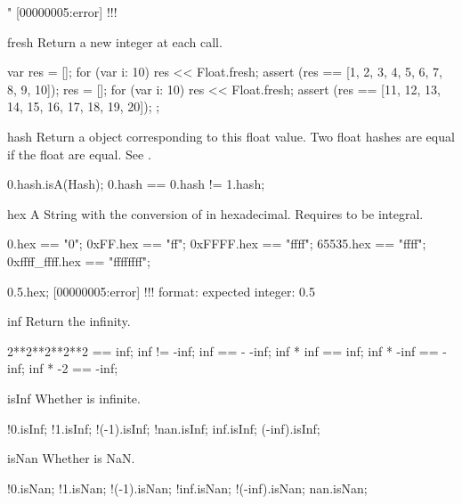 \begin{urbiscriptapi}
\begin{urbiassert}
"%
[00000005:error] !!! %
\end{urbiassert}

\item[fresh]%
  Return a new integer at each call.
\begin{urbiscript}
{
  var res = [];
  for (var i: 10)
    res << Float.fresh;
  assert (res == [1, 2, 3, 4, 5, 6, 7, 8, 9, 10]);
  res = [];
  for (var i: 10)
    res << Float.fresh;
  assert (res == [11, 12, 13, 14, 15, 16, 17, 18, 19, 20]);
};
\end{urbiscript}

\item[hash] Return a  object corresponding to this float
  value. Two float hashes are equal if the float are equal. See
  .

\begin{urbiassert}
0.hash.isA(Hash);
0.hash == 0.hash != 1.hash;
\end{urbiassert}

\item[hex]
  A String with the conversion of \this in hexadecimal.  Requires \this to
  be integral.
\begin{urbiassert}
          0.hex == "0";
       0xFF.hex == "ff";
     0xFFFF.hex == "ffff";
      65535.hex == "ffff";
0xffff_ffff.hex == "ffffffff";

0.5.hex;
[00000005:error] !!! format: expected integer: 0.5
\end{urbiassert}

\item[inf]
  Return the infinity.
\begin{urbiassert}
2**2**2**2**2 == inf;
inf != -inf;
inf == - -inf;
inf * inf == inf;
inf * -inf == -inf;
inf * -2 == -inf;
\end{urbiassert}

\item[isInf]
  Whether is infinite.
\begin{urbiassert}
    !0.isInf; !1.isInf; !(-1).isInf;
  !nan.isInf;
   inf.isInf;  (-inf).isInf;
\end{urbiassert}

\item[isNan]
  Whether is NaN.
\begin{urbiassert}
     !0.isNan; !1.isNan; !(-1).isNan;
   !inf.isNan;  !(-inf).isNan;
    nan.isNan;
\end{urbiassert}


\end{urbiscriptapi}
